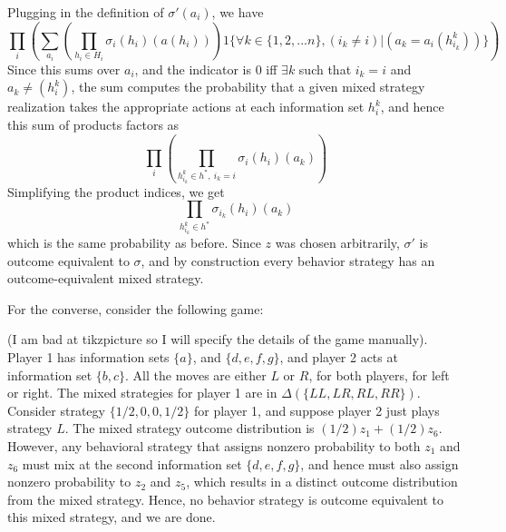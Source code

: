 \documentclass[10pt,letter]{article}
\begin{document}
Plugging  in the definition of $\sigma'(a_i)$, we have
\[ \prod_i \left( \sum_{a_i} \left( \prod_{h_i \in H_i} \sigma_i(h_i)(a(h_i)) \right) 1\{\forall k \in \{1, 2, ...n \}, (i_k  \neq i) | (a_k = a_i(h^k_{i_k}))  \} \right) \]
Since this sums over $a_i$, and the indicator is $0$ iff $\exists k$ such that $i_k = i$ and $a_k \neq (h^k_{i})$, the sum computes the probability that a given mixed strategy realization takes the appropriate actions at each information set $h^k_{i}$, and hence this sum of products factors as
\[ \prod_i  \left( \prod_{h^k_{i_k} \in h^*, \ i_k = i} \sigma_i(h_i)(a_k) \right) \]
Simplifying the product indices, we get
\[ \prod_{h^k_{i_k} \in h^*} \sigma_{i_k}(h_i)(a_k)  \]
which is the same probability as before. Since $z$ was chosen arbitrarily, $\sigma'$ is outcome equivalent to $\sigma$, and by construction every behavior strategy has an outcome-equivalent mixed strategy.

For the converse, consider the following game:


(I am bad at tikzpicture so I will specify the details of the game manually). Player 1 has information sets $\{ a\}$, and $\{ d, e, f, g\}$, and player 2 acts at information set $\{ b, c \}$. All the moves are either $L$ or $R$, for both players, for left or right. The mixed strategies for player 1 are in $\Delta(\{ LL, LR, RL, RR \})$. Consider strategy $\{ 1/2, 0, 0, 1/2 \}$ for player 1, and suppose player 2 just plays strategy $L$. The mixed strategy outcome distribution is $(1/2) z_1 + (1/2) z_6$. However, any behavioral strategy that assigns nonzero probability to both $z_1$ and $z_6$  must mix at the second information set $\{ d, e ,f, g \}$,
and hence must also assign nonzero probability to $z_2$ and $z_5$, which results in a distinct outcome distribution from the mixed strategy. Hence, no behavior strategy is outcome equivalent to this mixed strategy, and we are done.
\end{document}
